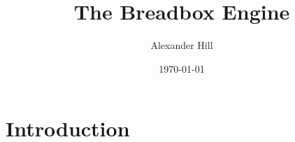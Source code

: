 \documentclass{article}
\title{The Breadbox Engine}
\author{Alexander Hill}
\date{\today}
\begin{document}
    \maketitle
    \section{Introduction}
\end{document}

